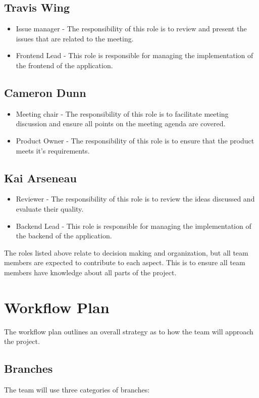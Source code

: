 \documentclass{article}
\begin{document}
\subsection*{Travis Wing}
\begin{itemize}
	\item Issue manager - The responsibility of this role is to review and present the issues that are related to the meeting. 
	\item Frontend Lead - This role is responsible for managing the implementation of the frontend of the application.
\end{itemize}

\subsection*{Cameron Dunn}
\begin{itemize}
	\item Meeting chair - The responsibility of this role is to facilitate meeting discussion and ensure all points on the meeting agenda are covered. 
  \item Product Owner - The responsibility of this role is to ensure that the product meets it's requirements.  
\end{itemize}

\subsection*{Kai Arseneau}
\begin{itemize}
	\item Reviewer - The responsibility of this role is to review the ideas discussed and evaluate their quality.  
	\item Backend Lead - This role is responsible for managing the implementation of the backend of the application.
\end{itemize}

\noindent The roles listed above relate to decision making and organization, but all team members are expected to contribute to each aspect. 
This is to ensure all team members have knowledge about all parts of the project. 


\section{Workflow Plan}
The workflow plan outlines an overall strategy as to how the team will approach the project.

\subsection{Branches}
The team will use three categories of branches: 
\end{document}
